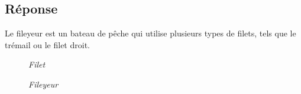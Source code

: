 \documentclass[12pt, report]{article}
\begin{document}
\subsection*{Réponse}
Le fileyeur est un bateau de pêche qui utilise plusieurs types de filets, tels que le trémail ou le filet droit. 
\begin{center}
\begin{figure}[ht]
\caption{\textit{Filet}}
\end{figure}
\end{center}
\begin{center}
\begin{figure}[ht]
\caption{\textit{Fileyeur}}
\end{figure}
\end{center}
\end{document}
